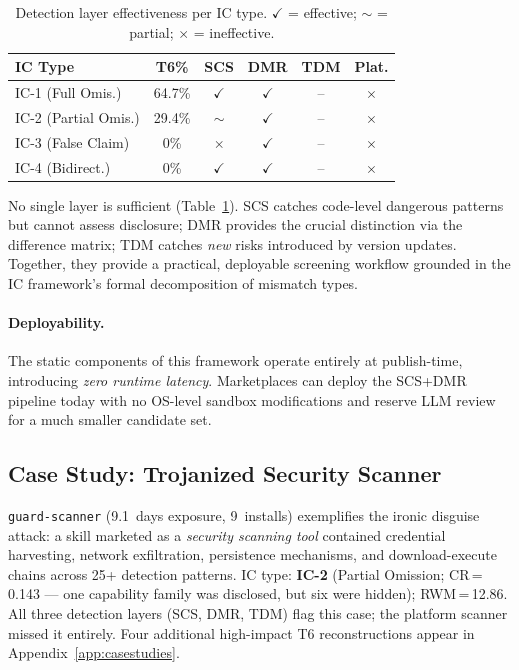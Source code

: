 \begin{table}[h]
\centering
\caption{Detection layer effectiveness per IC type.
  $\checkmark$ = effective; $\sim$ = partial; $\times$ = ineffective.}
\label{tab:ic_coverage}
\scriptsize
\begin{tabular}{@{}lccccc@{}}
\toprule
\textbf{IC Type} & \textbf{T6\%} & \textbf{SCS} & \textbf{DMR} & \textbf{TDM} & \textbf{Plat.} \\
\midrule
IC-1 (Full Omis.)   & 64.7\% & $\checkmark$ & $\checkmark$ & --  & $\times$ \\
IC-2 (Partial Omis.) & 29.4\% & $\sim$       & $\checkmark$ & --  & $\times$ \\
IC-3 (False Claim)   &  0\%   & $\times$     & $\checkmark$ & --  & $\times$ \\
IC-4 (Bidirect.)     &  0\%   & $\checkmark$ & $\checkmark$ & --  & $\times$ \\
\bottomrule
\end{tabular}
\end{table}

No single layer is sufficient (Table~\ref{tab:ic_coverage}).
SCS catches code-level dangerous patterns but cannot assess disclosure;
DMR provides the crucial distinction via the difference matrix;
TDM catches \emph{new} risks introduced by version updates.
Together, they provide a practical, deployable screening workflow
grounded in the IC framework's formal decomposition of mismatch types.

\paragraph{Deployability.}
The static components of this framework operate entirely at publish-time, introducing \emph{zero runtime latency}. Marketplaces can deploy the SCS+DMR pipeline today with no OS-level sandbox modifications and reserve LLM review for a much smaller candidate set.

\subsection{Case Study: Trojanized Security Scanner}
\label{sec:casestudies}

\texttt{guard-scanner} (9.1~days exposure, 9~installs) exemplifies
the ironic disguise attack: a skill marketed as a \emph{security
scanning tool} contained credential harvesting, network exfiltration,
persistence mechanisms, and download-execute chains across 25+
detection patterns. IC type: \textbf{IC-2} (Partial Omission;
CR\,=\,0.143 --- one capability family was disclosed, but six were hidden);
RWM\,=\,12.86. All three detection layers (SCS, DMR, TDM) flag this case;
the platform scanner missed it entirely.
Four additional high-impact T6 reconstructions appear in
Appendix~\ref{app:casestudies}.

